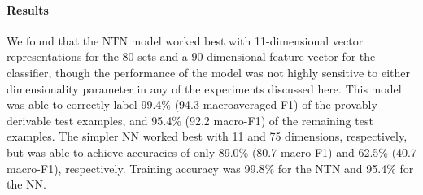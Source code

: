 \paragraph{Results} 
We found that the NTN model worked best with 11-dimensional vector
representations for the 80 sets and a 90-dimensional feature vector
for the classifier, though the performance of the model was not highly
sensitive to either dimensionality parameter in any of the experiments
discussed here. This model was able to correctly label 99.4\% (94.3
macroaveraged F1) of the provably derivable test examples, and 95.4\%
(92.2 macro-F1) of the remaining test examples. The simpler NN worked
best with 11 and 75 dimensions, respectively, but was able to achieve
accuracies of only 89.0\% (80.7 macro-F1) and 62.5\% (40.7 macro-F1),
respectively. Training accuracy was 99.8\% for the NTN and 95.4\% for
the NN.

